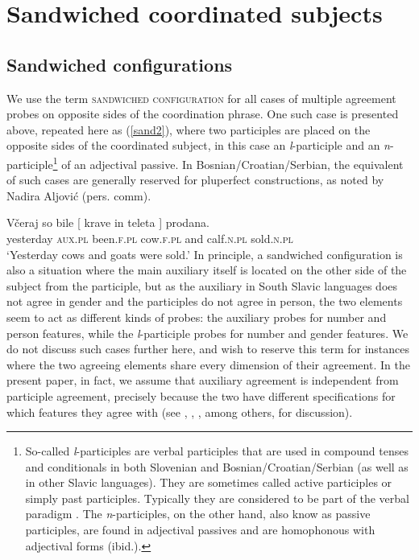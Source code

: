 \documentclass[output=paper
,modfonts
,nonflat]{langsci/langscibook}
\begin{document}
\section{Sandwiched coordinated subjects}
\subsection{Sandwiched configurations}\label{sec:sandwconf}

We use the term \textsc{sandwiched configuration} for all cases of multiple agreement probes on opposite sides of the coordination phrase. One such case is presented above, repeated here as (\ref{sand2}), where two participles are placed on the opposite sides of the coordinated subject, in this case an \textit{l}-participle and an \textit{n}-participle\footnote{So-called \textit{l}-participles are verbal participles that are used in compound tenses and conditionals in both Slovenian and Bosnian/Croatian/Serbian (as well as in other Slavic languages). They are sometimes called active participles or simply past participles. Typically they are considered to be part of the verbal paradigm \citep{browne:93,priestly:93}. The \textit{n}-participles, on the other hand, also know as passive participles, are found in adjectival passives and are homophonous with adjectival forms (ibid.).} of an adjectival passive. In Bosnian/Croatian/Serbian, the equivalent of such cases are generally reserved for pluperfect constructions, as noted by Nadira Aljović (pers. comm).

\ea \label{sand2}
\gll Včeraj      so    bile       [ krave    in    teleta ]    prodana.\\
yesterday \textsc{aux.pl} been.\textsc{f.pl} {} cow.\textsc{f.pl} and calf.\textsc{n.pl} {}   sold.\textsc{n.pl} \\
\glt `Yesterday cows and goats were sold.'
\z
In principle, a sandwiched configuration is also a situation where the main auxiliary itself is located on the other side of the subject from the participle, but as the auxiliary in South Slavic languages does not agree in gender and the participles do not agree in person, the two elements seem to act as different kinds of probes: the auxiliary probes for number and person features, while the \textit{l}-participle probes for number and gender features. We do not discuss such cases  further here, and wish to reserve this term for instances where the two agreeing elements share every dimension of their agreement. In the present paper, in fact, we assume that auxiliary agreement is independent from participle agreement, precisely because the two have different specifications for which features they agree with (see \citealt{dalessandro:07}, \citealt{lopez:07}, \citealt{puskar:17}, among others, for discussion).
\end{document}
